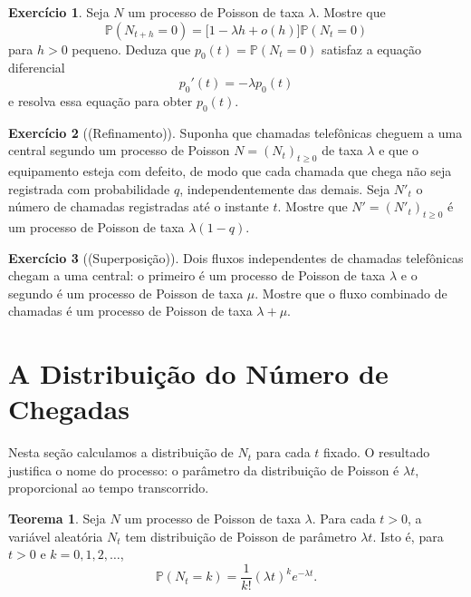 \documentclass[12pt,portuguese]{article}
\theoremstyle{definition}
\newtheorem{theorem}{Teorema}
\theoremstyle{plainexercise}
\newtheorem{exercise}{Exercício}
\theoremstyle{starredexercise}
\theoremstyle{definition}
\begin{document}
\begin{exercise}\label{exercise:zero-chegadas}
Seja $N$ um processo de Poisson de taxa $\lambda$. Mostre que
\[
  \mathbb{P}(N_{t+h}=0)=\bigl[1-\lambda h+o(h)\bigr]\mathbb{P}(N_t=0)
\]
para $h>0$ pequeno. Deduza que $p_0(t)=\mathbb{P}(N_t=0)$ satisfaz a equação
diferencial
\[
  p_0'(t)=-\lambda p_0(t)
\]
e resolva essa equação para obter $p_0(t)$.
\end{exercise}

\begin{exercise}[(Refinamento)]\label{exercise:afinamento}
Suponha que chamadas telefônicas cheguem a uma central segundo um processo de
Poisson $N=(N_t)_{t\geqslant0}$ de taxa $\lambda$ e que o equipamento esteja
com defeito, de modo que cada chamada que chega não seja registrada com
probabilidade $q$, independentemente das demais. Seja $N'_t$ o número de
chamadas registradas até o instante $t$. Mostre que $N'=(N'_t)_{t\geqslant0}$
é um processo de Poisson de taxa $\lambda(1-q)$.
\end{exercise}

\begin{exercise}[(Superposição)]\label{exercise:superposicao}
Dois fluxos independentes de chamadas telefônicas chegam a uma central: o
primeiro é um processo de Poisson de taxa $\lambda$ e o segundo é um processo
de Poisson de taxa $\mu$. Mostre que o fluxo combinado de chamadas é um
processo de Poisson de taxa $\lambda+\mu$.
\end{exercise}

\section{A Distribuição do Número de Chegadas}\label{sec:distribuicao-nt}

Nesta seção calculamos a distribuição de $N_t$ para cada $t$ fixado. O
resultado justifica o nome do processo: o parâmetro da distribuição de Poisson
é $\lambda t$, proporcional ao tempo transcorrido.

\begin{theorem}\label{thm:distribuicao-nt}
Seja $N$ um processo de Poisson de taxa $\lambda$. Para cada $t>0$, a variável
aleatória $N_t$ tem distribuição de Poisson de parâmetro $\lambda t$. Isto é,
para $t>0$ e $k=0,1,2,\ldots$,
\begin{equation}\label{eq:distribuicao-nt}
  \mathbb{P}(N_t=k)=\frac{1}{k!}(\lambda t)^k e^{-\lambda t}.
\end{equation}
\end{theorem}
\end{document}

